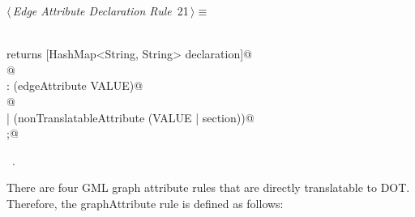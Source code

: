 \documentclass[a4paper]{report}
\begin{document}
\begin{flushleft} \small
\begin{minipage}{\linewidth}\label{scrap21}\raggedright\small
{} $\langle\,${\itshape Edge Attribute Declaration Rule}\nobreak\ {\footnotesize {21}}$\,\rangle\equiv$
\vspace{-1ex}
\begin{list}{}{} \item
\mbox{}\verb@@\\
\mbox{}\verb@edgeAttrDeclaration returns [HashMap<String, String> declaration]@\\
\mbox{}@\\
\mbox{}\verb@: (edgeAttribute VALUE)@\\
\mbox{}@\\
\mbox{}\verb@| (nonTranslatableAttribute (VALUE | section))@\\
\mbox{};@\\
\mbox{}\verb@@{\NWsep}
\end{list}
\vspace{-1.5ex}
\footnotesize
\begin{list}{}{\setlength{\itemsep}{-\parsep}\setlength{\itemindent}{-\leftmargin}}
\item \NWtxtMacroRefIn\ .

\item{}
\end{list}
\end{minipage}\vspace{4ex}
\end{flushleft}
There are four GML graph attribute rules that are directly translatable to DOT. Therefore, the graphAttribute rule is defined as follows:
\end{document}
